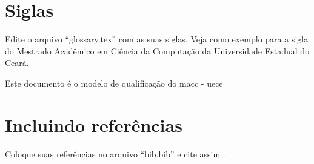 \section{Siglas}

Edite o arquivo ``glossary.tex'' com as suas siglas. Veja como exemplo para a sigla do Mestrado Acadêmico em Ciência da Computação da Universidade
Estadual do Ceará.

Este documento é o modelo de qualificação do \acrshort{macc} - \acrshort{uece}

\section{Incluindo referências}

Coloque suas referências no arquivo ``bib.bib'' e cite assim \cite{lamport1986latex}.
